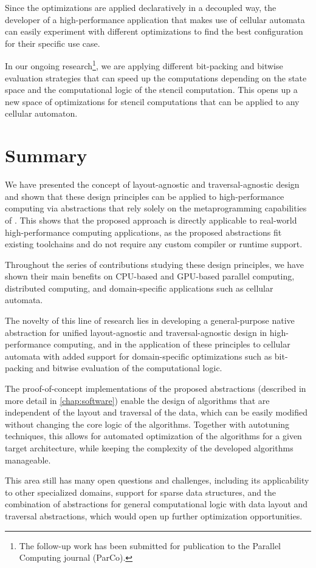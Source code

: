 Since the optimizations are applied declaratively in a decoupled way, the developer of a high-performance application that makes use of cellular automata can easily experiment with different optimizations to find the best configuration for their specific use case.

In our ongoing research\footnote{The follow-up work has been submitted for publication to the Parallel Computing journal (ParCo).}, we are applying different bit-packing and bitwise evaluation strategies that can speed up the computations depending on the state space and the computational logic of the stencil computation. This opens up a new space of optimizations for stencil computations that can be applied to any cellular automaton.


\section{Summary}\label{sec:abstractions-summary}

We have presented the concept of layout-agnostic and traversal-agnostic design and shown that these design principles can be applied to high-performance computing via abstractions that rely solely on the metaprogramming capabilities of \cpp. This shows that the proposed approach is directly applicable to real-world high-performance computing applications, as the proposed abstractions fit existing \cpp toolchains and do not require any custom compiler or runtime support.

Throughout the series of contributions studying these design principles, we have shown their main benefits on CPU-based and GPU-based parallel computing, distributed computing, and domain-specific applications such as cellular automata.

The novelty of this line of research lies in developing a general-purpose native abstraction for unified layout-agnostic and traversal-agnostic design in high-performance computing, and in the application of these principles to cellular automata with added support for domain-specific optimizations such as bit-packing and bitwise evaluation of the computational logic.

The proof-of-concept implementations of the proposed abstractions (described in more detail in \cref{chap:software}) enable the design of algorithms that are independent of the layout and traversal of the data, which can be easily modified without changing the core logic of the algorithms. Together with autotuning techniques, this allows for automated optimization of the algorithms for a given target architecture, while keeping the complexity of the developed algorithms manageable.

This area still has many open questions and challenges, including its applicability to other specialized domains, support for sparse data structures, and the combination of abstractions for general computational logic with data layout and traversal abstractions, which would open up further optimization opportunities.
